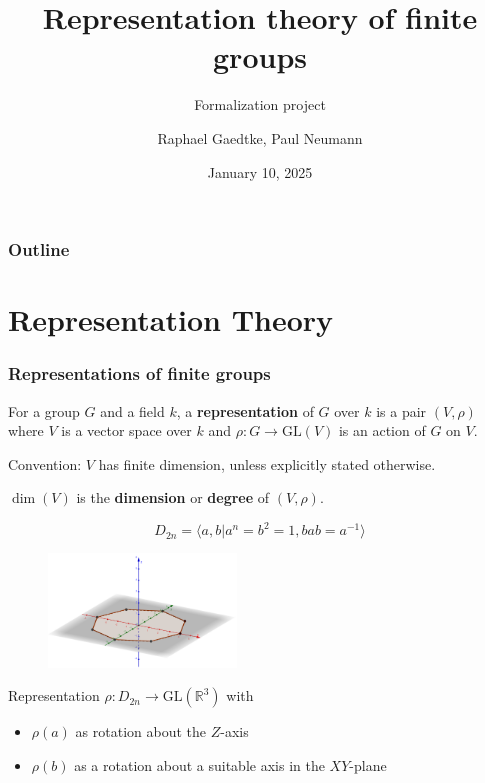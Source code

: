 \documentclass{beamer}
\title{Representation theory of finite groups}
\subtitle{Formalization project}
\author{Raphael Gaedtke, Paul Neumann}
\institute{University of Bonn}
\date{January 10, 2025}
\newcommand{\GL}{\text{GL}}
\newcommand{\inv}{^{-1}}
\newcommand{\R}{\mathbb{R}}
\begin{document}
\begin{frame}
\titlepage
\end{frame}

\begin{frame}
\frametitle{Outline}
\tableofcontents
\end{frame}

\section{Representation Theory}
\begin{frame}
\frametitle{Representations of finite groups}
\begin{definition}
For a group \(G\) and a field \(k\), a \textbf{representation} of \(G\) over \(k\) is a pair \((V, \rho)\) where \(V\) is a vector space over \(k\) and \(\rho: G\to \GL (V)\) is an action of \(G\) on \(V\).
\end{definition}
\pause
Convention: \(V\) has finite dimension, unless explicitly stated otherwise.
\begin{definition}
\(\dim (V)\) is the \textbf{dimension} or \textbf{degree} of \((V, \rho)\).
\end{definition}
\end{frame}


\begin{frame}
\begin{example}
\begin{equation*}
D_{2n} = \langle a, b \vert a^n = b^2 = 1, bab = a\inv \rangle
\end{equation*}
\begin{figure}[h]
\begin{center}
\includegraphics[width = 5cm]{images/octagon.png}
\end{center}
\end{figure}
\pause
Representation \(\rho: D_{2n} \to \GL (\R^3)\) with 
\begin{itemize}
\item \(\rho(a)\) as rotation about the \(Z\)-axis
\item \(\rho(b)\) as a rotation about a suitable axis in the \(XY\)-plane
\end{itemize}
\end{example}
\end{frame}
\end{document}
